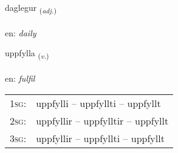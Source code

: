 \documentclass[frontgrid, backgrid]{flacards}\usepackage[]{graphicx}\usepackage[]{color}
\begin{document}
\renewcommand{\flhead}{\vskip5pt \fboxsep=0pt {\small\bfseries\footnotesize Lýsingarorð | Adjective}}
\renewcommand{\fcfoot}{\vskip5pt \fboxsep=0pt \hspace{2pt}{\small\bfseries\footnotesize 2K}}

\renewcommand{\blhead}{\vskip5pt {\small\bfseries\footnotesize Lýsingarorð | Adjective }}
\renewcommand{\bcfoot}{\vskip5pt \hspace{2pt}{\small\bfseries\footnotesize 2K}}


{daglegur \small{\textsubscript{(\textit{adj.})}} \\[1ex] %
\textphonetic{[taɣlɛɣʏr]} \\
en: \emph{daily} \\  [2ex]
\renewcommand*{\arraystretch}{0.8}
}

\renewcommand{\flhead}{\vskip5pt \fboxsep=0pt {\small\bfseries\footnotesize Sagnorð | Verb}}
\renewcommand{\fcfoot}{\vskip5pt \fboxsep=0pt \hspace{2pt}{\small\bfseries\footnotesize 2K}}

\renewcommand{\blhead}{\vskip5pt {\small\bfseries\footnotesize Sagnorð | Verb }}
\renewcommand{\bcfoot}{\vskip5pt \hspace{2pt}{\small\bfseries\footnotesize 2K}}


{uppfylla \small{\textsubscript{(\textit{v.})}} \\[1ex] %
\textphonetic{[ʏhpfɪtla]} \\
en: \emph{fulfil} \\  [2ex]
\renewcommand*{\arraystretch}{0.8}
\begin{tabular}{p{1cm}l}
\textsc{1sg}: & uppfylli -- uppfyllti -- uppfyllt \\ 
\textsc{2sg}: & uppfyllir -- uppfylltir -- uppfyllt \\ 
\textsc{3sg}: & uppfyllir -- uppfyllti -- uppfyllt \\ 
\end{tabular}
}
\end{document}
